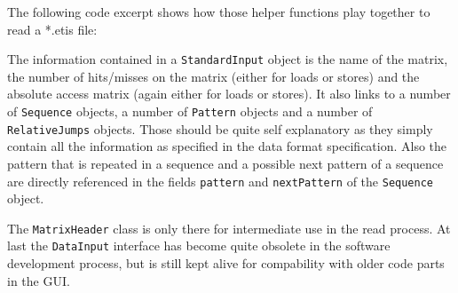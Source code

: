 The following code excerpt shows how those helper functions play together
to read a {*}.etis file:



The information contained in a \texttt{StandardInput} object is the
name of the matrix, the number of hits/misses on the matrix (either
for loads or stores) and the absolute access matrix (again either
for loads or stores). It also links to a number of \texttt{Sequence}
objects, a number of \texttt{Pattern} objects and a number of \texttt{RelativeJumps}
objects. Those should be quite self explanatory as they simply contain
all the information as specified in the data format specification.
Also the pattern that is repeated in a sequence and a possible next
pattern of a sequence are directly referenced in the fields \texttt{pattern}
and \texttt{nextPattern} of the \texttt{Sequence} object.

The \texttt{MatrixHeader} class is only there for intermediate use
in the read process. At last the \texttt{DataInput} interface has
become quite obsolete in the software development process, but is
still kept alive for compability with older code parts in the GUI.
